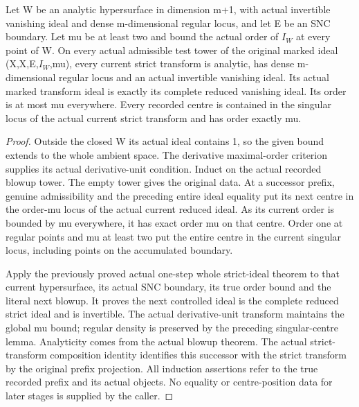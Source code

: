 \begin{theorem}
\label{hir:maximum-phase-entire-current-ideal}
\leanok
Let W be an analytic hypersurface in dimension m+1, with actual
invertible vanishing ideal and dense m-dimensional regular locus, and
let E be an SNC boundary. Let mu be at least two and bound the actual
order of $I_W$ at every point of W. On every actual admissible test tower
of the original marked ideal (X,X,E,$I_W$,mu), every current strict
transform is analytic, has dense m-dimensional regular locus and an
actual invertible vanishing ideal. Its actual marked transform ideal
is exactly its complete reduced vanishing ideal. Its order is at most
mu everywhere. Every recorded centre is contained in the singular
locus of the actual current strict transform and has order exactly mu.
\end{theorem}
\begin{proof}
Outside the closed W its actual ideal contains 1, so the given bound
extends to the whole ambient space. The derivative maximal-order
criterion supplies its actual derivative-unit condition. Induct on the
actual recorded blowup tower. The empty tower gives the original data.
At a successor prefix, genuine admissibility and the preceding entire
ideal equality put its next centre in the order-mu locus of the actual
current reduced ideal. As its current order is bounded by mu everywhere,
it has exact order mu on that centre. Order one at regular points and
mu at least two put the entire centre in the current singular locus,
including points on the accumulated boundary.

Apply the previously proved actual one-step whole strict-ideal theorem
to that current hypersurface, its actual SNC boundary, its true order
bound and the literal next blowup. It proves the next controlled ideal
is the complete reduced strict ideal and is invertible. The actual
derivative-unit transform maintains the global mu bound; regular density
is preserved by the preceding singular-centre lemma. Analyticity comes
from the actual blowup theorem. The actual strict-transform composition
identity identifies this successor with the strict transform by the
original prefix projection. All induction assertions refer to the true
recorded prefix and its actual objects. No equality or centre-position
data for later stages is supplied by the caller.
\end{proof}

